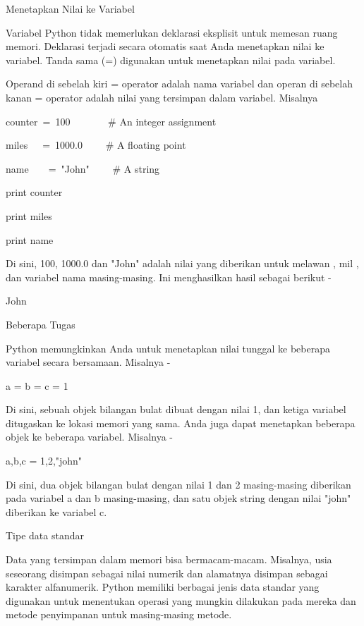 \noindent 
Menetapkan Nilai ke Variabel \par
\noindent 
Variabel Python tidak memerlukan deklarasi eksplisit untuk memesan ruang memori. $  $Deklarasi terjadi secara otomatis saat Anda menetapkan nilai ke variabel. $  $Tanda sama (=) digunakan untuk menetapkan nilai pada variabel. \par
\noindent 
Operand di sebelah kiri = operator adalah nama variabel dan operan di sebelah kanan = operator adalah nilai yang tersimpan dalam variabel. $  $Misalnya  \par
\vspace{12pt}
\noindent 
counter~=~100~~~~~~~    $  \#  $ An integer assignment \par
\noindent 
miles~~~=~1000.0~~~~    $  \#  $ A floating point \par
\noindent 
name~~~~=~"John"~~~~    $  \#  $ A string \par
\vspace{12pt}
\noindent 
print counter \par
\noindent 
print miles \par
\noindent 
print name \par
\noindent 
Di sini, 100, 1000.0 dan "John" adalah nilai yang diberikan untuk $  $melawan $  $, $  $mil $  $, dan $  $variabel $  $nama $  $masing-masing. $  $Ini menghasilkan hasil sebagai berikut - \par
{} \par
{} \par
\noindent 
John \par
\noindent 
Beberapa Tugas \par
\noindent 
Python memungkinkan Anda untuk menetapkan nilai tunggal ke beberapa variabel secara bersamaan. $  $Misalnya - \par
\noindent 
a = b = c = 1 \par
\noindent 
Di sini, sebuah objek bilangan bulat dibuat dengan nilai 1, dan ketiga variabel ditugaskan ke lokasi memori yang sama. $  $Anda juga dapat menetapkan beberapa objek ke beberapa variabel. $  $Misalnya - \par
\noindent 
a,b,c = 1,2,"john" \par
\noindent 
Di sini, dua objek bilangan bulat dengan nilai 1 dan 2 masing-masing diberikan pada variabel a dan b masing-masing, dan satu objek string dengan nilai "john" diberikan ke variabel c. \par
\noindent 
Tipe data standar \par
\noindent 
Data yang tersimpan dalam memori bisa bermacam-macam. $  $Misalnya, usia seseorang disimpan sebagai nilai numerik dan alamatnya disimpan sebagai karakter alfanumerik. $  $Python memiliki berbagai jenis data standar yang digunakan untuk menentukan operasi yang mungkin dilakukan pada mereka dan metode penyimpanan untuk masing-masing metode. \par
